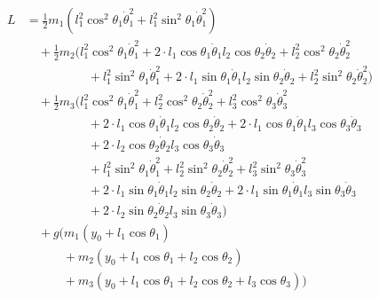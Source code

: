 \documentclass[11pt,a4paper]{article}
\begin{document}
\begin{align*}
L &= \frac{1}{2} m_1 \left( l_1^2 \cos^2\theta_1 \dot{\theta}_1^2 + l_1^2 \sin^2\theta_1 \dot{\theta}_1^2 \right) \\
    &\quad + \frac{1}{2} m_2 \big( l_1^2 \cos^2\theta_1 \dot{\theta}_1^2 + 2 \cdot l_1 \cos\theta_1 \dot{\theta}_1 l_2 \cos\theta_2 \dot{\theta}_2 + l_2^2 \cos^2\theta_2 \dot{\theta}_2^2 \\
        &\qquad\qquad\quad + l_1^2 \sin^2\theta_1 \dot{\theta}_1^2 + 2 \cdot l_1 \sin\theta_1 \dot{\theta}_1 l_2 \sin\theta_2 \dot{\theta}_2 + l_2^2 \sin^2\theta_2 \dot{\theta}_2^2 \big) \\
    &\quad + \frac{1}{2} m_3 \big( l_1^2 \cos^2\theta_1 \dot{\theta}_1^2 + l_2^2 \cos^2\theta_2 \dot{\theta}_2^2 + l_3^2 \cos^2\theta_3 \dot{\theta}_3^2 \\
        &\qquad\qquad\quad + 2 \cdot l_1 \cos\theta_1 \dot{\theta}_1 l_2 \cos\theta_2 \dot{\theta}_2 + 2 \cdot l_1 \cos\theta_1 \dot{\theta}_1 l_3 \cos\theta_3 \dot{\theta}_3 \\
        &\qquad\qquad\quad + 2 \cdot l_2 \cos\theta_2 \dot{\theta}_2 l_3 \cos\theta_3 \dot{\theta}_3 \\
        &\qquad\qquad\quad + l_1^2 \sin^2\theta_1 \dot{\theta}_1^2 + l_2^2 \sin^2\theta_2 \dot{\theta}_2^2 + l_3^2 \sin^2\theta_3 \dot{\theta}_3^2 \\
        &\qquad\qquad\quad + 2 \cdot l_1 \sin\theta_1 \dot{\theta}_1 l_2 \sin\theta_2 \dot{\theta}_2 + 2 \cdot l_1 \sin\theta_1 \dot{\theta}_1 l_3 \sin\theta_3 \dot{\theta}_3 \\
        &\qquad\qquad\quad + 2 \cdot l_2 \sin\theta_2 \dot{\theta}_2 l_3 \sin\theta_3 \dot{\theta}_3 \big) \\
    &\quad + g \big( m_1 (y_0 + l_1 \cos\theta_1) \\
        &\qquad\quad + m_2 (y_0 + l_1 \cos\theta_1 + l_2 \cos\theta_2) \\
        &\qquad\quad + m_3 (y_0 + l_1 \cos\theta_1 + l_2 \cos\theta_2 + l_3 \cos\theta_3) \big)
\end{align*}
\end{document}
